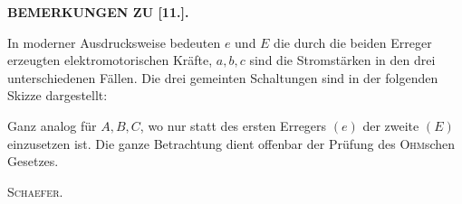 \bigskip\begin{center}\textbf{BEMERKUNGEN ZU [11.].}\end{center}
\begingroup\small
\indent In moderner Ausdrucksweise bedeuten \(e\) und \(E\) die durch die beiden Erreger erzeugten elektromotorischen
Kräfte, \(a,b,c\) sind die Stromstärken in den drei unterschiedenen Fällen. Die drei gemeinten
Schaltungen sind in der folgenden Skizze dargestellt:

\noindent Ganz analog für \(A,B,C\), wo nur statt des ersten Erregers \((e)\) der zweite \((E)\) einzusetzen ist. Die ganze
Betrachtung dient offenbar der Prüfung des \textsc{Ohm}schen Gesetzes.
\par\raggedleft\textsc{Schaefer}.\par
\clearpage\endgroup\endgroup
